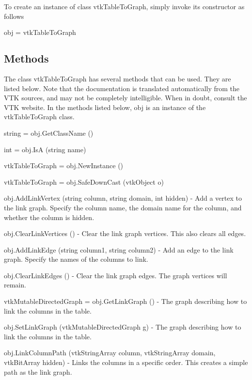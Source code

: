 To create an instance of class vtk\-Table\-To\-Graph, simply invoke its constructor as follows \begin{DoxyVerb}  obj = vtkTableToGraph
\end{DoxyVerb}
 \hypertarget{vtkwidgets_vtkxyplotwidget_Methods}{}\subsection{Methods}\label{vtkwidgets_vtkxyplotwidget_Methods}
The class vtk\-Table\-To\-Graph has several methods that can be used. They are listed below. Note that the documentation is translated automatically from the V\-T\-K sources, and may not be completely intelligible. When in doubt, consult the V\-T\-K website. In the methods listed below, {\ttfamily obj} is an instance of the vtk\-Table\-To\-Graph class. 
\begin{DoxyItemize}
\item {\ttfamily string = obj.\-Get\-Class\-Name ()}  
\item {\ttfamily int = obj.\-Is\-A (string name)}  
\item {\ttfamily vtk\-Table\-To\-Graph = obj.\-New\-Instance ()}  
\item {\ttfamily vtk\-Table\-To\-Graph = obj.\-Safe\-Down\-Cast (vtk\-Object o)}  
\item {\ttfamily obj.\-Add\-Link\-Vertex (string column, string domain, int hidden)} -\/ Add a vertex to the link graph. Specify the column name, the domain name for the column, and whether the column is hidden.  
\item {\ttfamily obj.\-Clear\-Link\-Vertices ()} -\/ Clear the link graph vertices. This also clears all edges.  
\item {\ttfamily obj.\-Add\-Link\-Edge (string column1, string column2)} -\/ Add an edge to the link graph. Specify the names of the columns to link.  
\item {\ttfamily obj.\-Clear\-Link\-Edges ()} -\/ Clear the link graph edges. The graph vertices will remain.  
\item {\ttfamily vtk\-Mutable\-Directed\-Graph = obj.\-Get\-Link\-Graph ()} -\/ The graph describing how to link the columns in the table.  
\item {\ttfamily obj.\-Set\-Link\-Graph (vtk\-Mutable\-Directed\-Graph g)} -\/ The graph describing how to link the columns in the table.  
\item {\ttfamily obj.\-Link\-Column\-Path (vtk\-String\-Array column, vtk\-String\-Array domain, vtk\-Bit\-Array hidden)} -\/ Links the columns in a specific order. This creates a simple path as the link graph.  

\end{DoxyItemize}
